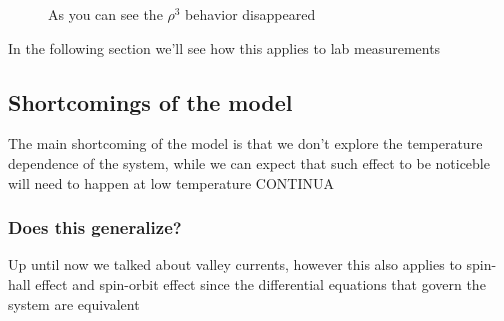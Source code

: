 \begin{figure}
    \caption{As you can see the $\rho^3$ behavior disappeared}
    \label{fig:mixedrho}
\end{figure}

In the following section we'll see how this applies to lab measurements

\subsection{Shortcomings of the model}
The main shortcoming of the model is that we don't explore the temperature dependence of the system, while we can expect that such effect to be noticeble will need to happen at low temperature CONTINUA


\subsubsection*{Does this generalize?}
Up until now we talked about valley currents, however this also applies to spin-hall effect and spin-orbit effect since the differential equations that govern the system are equivalent

